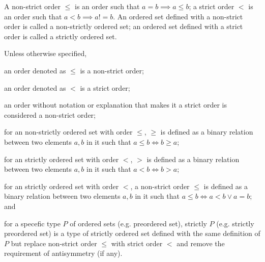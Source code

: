 \documentclass[a4paper,12pt]{article}
\begin{document}
A non-strict order $\leq$ is an order such that $a=b\implies a\leq b$; a strict order $<$ is an order such that $a<b\implies a!=b$. An ordered set defined with a non-strict order is called a non-strictly ordered set; an ordered set defined with a strict order is called a strictly ordered set.

Unless otherwise specified,
\bit
\item an order denoted as $\leq$ is a non-strict order;
\item an order denoted as $<$ is a strict order;
\item an order without notation or explanation that makes it a strict order is considered a non-strict order;
\item for an non-strictly ordered set with order $\leq$, $\geq$ is defined as a binary relation between two elements $a,b$ in it such that $a\leq b\iff b\geq a$;
\item for an strictly ordered set with order $<$, $>$ is defined as a binary relation between two elements $a,b$ in it such that $a<b\iff b>a$;
\item for an strictly ordered set with order $<$, a non-strict order $\leq$ is defined as a binary relation between two elements $a,b$ in it such that $a\leq b\iff a<b\lor a=b$; and
\item for a specefic type $P$ of ordered sets (e.g. preordered set), strictly $P$ (e.g. strictly preordered set) is a type of strictly ordered set defined with the same definition of $P$ but replace non-strict order $\leq$ with strict order $<$ and remove the requirement of antisymmetry (if any).
\eit
\end{document}
